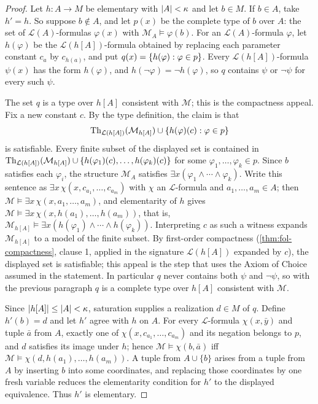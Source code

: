 \documentclass[11pt,oneside,openany]{book}
\theoremstyle{definition}
\theoremstyle{plain}
\theoremstyle{remark}
\DeclarePairedDelimiter{\set}{\lbrace}{\rbrace}
\DeclarePairedDelimiter{\abs}{\lvert}{\rvert}
\newcommand{\Lang}{\mathcal{L}}
\newcommand{\Th}{\operatorname{Th}}
\newcommand{\entails}{\models}
\begin{document}
\begin{proof}
Let \(h:A\to M\) be elementary with \(\abs{A}<\kappa\) and let \(b\in M\).
If \(b\in A\), take \(h'=h\).  So suppose \(b\notin A\), and let \(p(x)\)
be the complete type of \(b\) over \(A\): the set of
\(\Lang(A)\)-formulas \(\varphi(x)\) with
\(\mathcal M_A\entails\varphi(b)\).  For an \(\Lang(A)\)-formula
\(\varphi\), let \(h(\varphi)\) be the \(\Lang(h[A])\)-formula obtained by
replacing each parameter constant \(c_a\) by \(c_{h(a)}\), and put
\(q(x)=\set{h(\varphi):\varphi\in p}\).  Every \(\Lang(h[A])\)-formula
\(\psi(x)\) has the form \(h(\varphi)\), and
\(h(\neg\varphi)=\neg h(\varphi)\), so \(q\) contains \(\psi\) or
\(\neg\psi\) for every such \(\psi\).

The set \(q\) is a type over \(h[A]\) consistent with \(\mathcal M\); this
is the compactness appeal.  Fix a new constant \(c\).  By the type
definition, the claim is that
\[
  \Th_{\Lang(h[A])}(\mathcal M_{h[A]})\cup\set{h(\varphi)(c):\varphi\in p}
\]
is satisfiable.  Every finite subset of the displayed set is contained in
\(\Th_{\Lang(h[A])}(\mathcal M_{h[A]})\cup
\set{h(\varphi_1)(c),\ldots,h(\varphi_k)(c)}\) for some
\(\varphi_1,\ldots,\varphi_k\in p\).  Since \(b\) satisfies each
\(\varphi_i\), the structure \(\mathcal M_A\) satisfies
\(\exists x(\varphi_1\land\cdots\land\varphi_k)\).  Write this sentence as
\(\exists x\,\chi(x,c_{a_1},\ldots,c_{a_m})\) with \(\chi\) an
\(\Lang\)-formula and \(a_1,\ldots,a_m\in A\); then
\(\mathcal M\entails\exists x\,\chi(x,a_1,\ldots,a_m)\), and elementarity
of \(h\) gives
\(\mathcal M\entails\exists x\,\chi(x,h(a_1),\ldots,h(a_m))\), that is,
\(\mathcal M_{h[A]}\entails
\exists x(h(\varphi_1)\land\cdots\land h(\varphi_k))\).  Interpreting
\(c\) as such a witness expands \(\mathcal M_{h[A]}\) to a model of the
finite subset.  By first-order compactness (\cref{thm:fol-compactness},
clause 1, applied in the signature \(\Lang(h[A])\) expanded by \(c\)), the
displayed set is satisfiable; this appeal is the step that uses the Axiom
of Choice assumed in the statement.  In particular \(q\) never contains
both \(\psi\) and \(\neg\psi\), so with the previous paragraph \(q\) is a
complete type over \(h[A]\) consistent with \(\mathcal M\).

Since \(\abs{h[A]}\leq\abs{A}<\kappa\), saturation supplies a realization
\(d\in M\) of \(q\).  Define \(h'(b)=d\) and let \(h'\) agree with \(h\) on
\(A\).  For every \(\Lang\)-formula \(\chi(x,\bar y)\) and tuple \(\bar a\)
from \(A\), exactly one of \(\chi(x,c_{a_1},\ldots,c_{a_m})\) and its
negation belongs to \(p\), and \(d\) satisfies its image under \(h\);
hence \(\mathcal M\entails\chi(b,\bar a)\) iff
\(\mathcal M\entails\chi(d,h(a_1),\ldots,h(a_m))\).  A tuple from
\(A\cup\{b\}\) arises from a tuple from \(A\) by inserting \(b\) into some
coordinates, and replacing those coordinates by one fresh variable reduces
the elementarity condition for \(h'\) to the displayed equivalence.  Thus
\(h'\) is elementary.
\end{proof}
\end{document}
